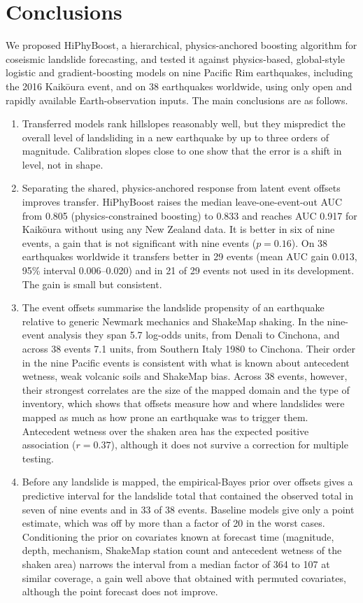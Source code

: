 \section{Conclusions}\label{sec:concl}
We proposed HiPhyBoost, a hierarchical, physics-anchored boosting algorithm for coseismic landslide forecasting, and tested it against physics-based, global-style logistic and gradient-boosting models on nine Pacific Rim earthquakes, including the 2016 Kaik\={o}ura event, and on 38 earthquakes worldwide, using only open and rapidly available Earth-observation inputs. The main conclusions are as follows.
\begin{enumerate}
\item Transferred models rank hillslopes reasonably well, but they mispredict the overall level of landsliding in a new earthquake by up to three orders of magnitude. Calibration slopes close to one show that the error is a shift in level, not in shape.
\item Separating the shared, physics-anchored response from latent event offsets improves transfer. HiPhyBoost raises the median leave-one-event-out AUC from 0.805 (physics-constrained boosting) to 0.833 and reaches AUC 0.917 for Kaik\={o}ura without using any New Zealand data. It is better in six of nine events, a gain that is not significant with nine events ($p=0.16$). On 38 earthquakes worldwide it transfers better in 29 events (mean AUC gain 0.013, 95\% interval 0.006--0.020) and in 21 of 29 events not used in its development. The gain is small but consistent.
\item The event offsets summarise the landslide propensity of an earthquake relative to generic Newmark mechanics and ShakeMap shaking. In the nine-event analysis they span 5.7 log-odds units, from Denali to Cinchona, and across 38 events 7.1 units, from Southern Italy 1980 to Cinchona. Their order in the nine Pacific events is consistent with what is known about antecedent wetness, weak volcanic soils and ShakeMap bias. Across 38 events, however, their strongest correlates are the size of the mapped domain and the type of inventory, which shows that offsets measure how and where landslides were mapped as much as how prone an earthquake was to trigger them. Antecedent wetness over the shaken area has the expected positive association ($r=0.37$), although it does not survive a correction for multiple testing.
\item Before any landslide is mapped, the empirical-Bayes prior over offsets gives a predictive interval for the landslide total that contained the observed total in seven of nine events and in 33 of 38 events. Baseline models give only a point estimate, which was off by more than a factor of 20 in the worst cases. Conditioning the prior on covariates known at forecast time (magnitude, depth, mechanism, ShakeMap station count and antecedent wetness of the shaken area) narrows the interval from a median factor of 364 to 107 at similar coverage, a gain well above that obtained with permuted covariates, although the point forecast does not improve.

\end{enumerate}
